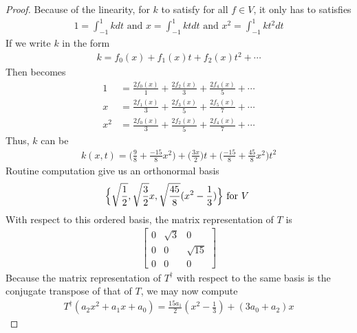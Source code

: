 \documentclass{report}
\begin{document}
\begin{proof}
Because of the linearity, for $k$ to satisfy  for all $f\in V$, it only has to satisfies 
\begin{align}
\label{solve}
1=\int_{-1}^{1}kdt\text{ and }x=\int_{-1}^{1}ktdt \text{ and }x^2 =\int_{-1}^{1}kt^2dt
\end{align}
If we write $k$ in the form 
\begin{align*}
k= f_0(x)+ f_1(x)t+ f_2(x)t^2 + \cdots 
\end{align*}
Then  becomes 
\begin{align*}
1&= \frac{2f_0(x)}{1}+ \frac{2f_2(x)}{3}+ \frac{2f_4(x)}{5}+ \cdots  \\
x&=  \frac{2f_1(x)}{3}+ \frac{2f_3(x)}{5}+ \frac{2f_5(x)}{7}+ \cdots \\
x^2&= \frac{2f_0(x)}{3} + \frac{2f_2(x)}{5}+ \frac{2f_4(x)}{7}+ \cdots 
\end{align*}
Thus, $k$ can be 
\begin{align*}
k(x,t)= \Big(\frac{9}{8}+ \frac{-15}{8}x^2\Big)+ \Big(\frac{3x}{2}\Big)t+ \Big(\frac{-15}{8}+ \frac{45}{8}x^2\Big)t^2 
\end{align*}
Routine computation give us an orthonormal basis 
\begin{align*}
\Big\{ \sqrt{\frac{1}{2}}, \sqrt{\frac{3}{2}}x, \sqrt{\frac{45}{8}}(x^2- \frac{1}{3}) \Big\}\text{ for $V$ }
\end{align*}
With respect to this ordered basis, the matrix representation of $T$ is 
\begin{align*}
\begin{bmatrix}
  0 & \sqrt{3}  & 0 \\
  0 & 0 & \sqrt{15} \\
  0 & 0 & 0 
\end{bmatrix}
\end{align*}
Because the matrix representation of $T^\dagger $ with respect to the same basis is the conjugate transpose of that of  $T$, we may now compute 
 \begin{align*}
T^\dagger (a_2x^2+a_1x+a_0)= \frac{15a_1}{2}(x^2- \frac{1}{3})+ (3a_0+a_2)x
\end{align*}
\end{proof}
\end{document}
